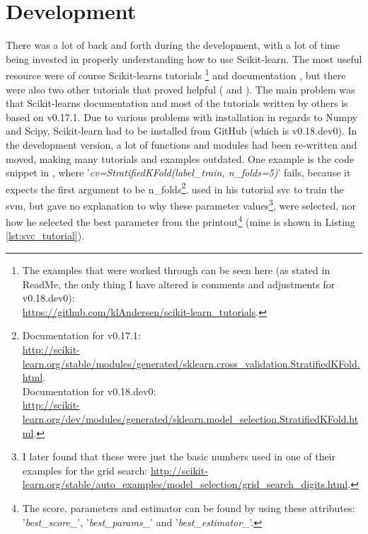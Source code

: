 \section{Development}
\label{sec:development}
There was a lot of back and forth during the development, with a lot of time being invested in properly understanding how to use Scikit-learn.
The most useful resource were of course Scikit-learns tutorials \cite{Scikitlearn.org2016j}\footnote{
	The examples that were worked through can be seen here (as stated in ReadMe, the only thing I have altered is comments and adjustments for v0.18.dev0): \\
	\url{https://github.com/klAndersen/scikit-learn_tutorials}.
	} and documentation \cite{Scikitlearn.org2016,Scikitlearn.org2016h}, 
but there were also two other tutorials that proved helpful (\cite{Rehurek2014} and \cite{Elahi2016}).
The main problem was that Scikit-learns documentation and most of the tutorials written by others is based on v0.17.1.
Due to various problems with installation in regards to Numpy and Scipy, Scikit-learn had to be installed from GitHub (which is v0.18.dev0).
In the development version, a lot of functions and modules had been re-written and moved, making many tutorials and examples outdated.
One example is the code snippet in \cite["In $\lbrack$42$\rbrack$"]{Rehurek2014}, where '\emph{cv=StratifiedKFold(label\_train, n\_folds=5)}' fails, 
because it expects the first argument to be n\_folds\footnote{
	Documentation for v0.17.1: \\
	\url{http://scikit-learn.org/stable/modules/generated/sklearn.cross_validation.StratifiedKFold.html}. \\
	Documentation for v0.18.dev0: \\
	\url{http://scikit-learn.org/dev/modules/generated/sklearn.model_selection.StratifiedKFold.html}.
}.
\vspace{0.5em}\newline
{}
\textcite{Rehurek2014} used in his tutorial \gls{svc} to train the \gls{svm}, but gave no explanation to why these parameter values\footnote{
	I later found that these were just the basic numbers used in one of their examples for the grid search: 
	\url{http://scikit-learn.org/stable/auto_examples/model_selection/grid_search_digits.html}.
},
were selected, nor how he selected the best parameter from the printout\footnote{
	The score, parameters and estimator can be found by using these attributes: '\emph{best\_score\_}', '\emph{best\_params\_}' and '\emph{best\_estimator\_}'.
} (mine is shown in Listing \ref{lst:svc_tutorial}).

